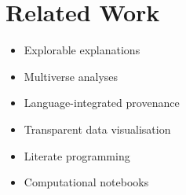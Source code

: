\section{Related Work}
\label{sec:related}

\begin{itemize}
\item Explorable explanations \cite{victor11b}
\item Multiverse analyses \cite{steegen16,dragicevic19}
\item Language-integrated provenance \cite{fehrenbach16}
\item Transparent data visualisation \cite{psallidas18,perera22,bond24}
\item Literate programming \cite{knuth84}
\item Computational notebooks \cite{kluyver16}
\end{itemize}
